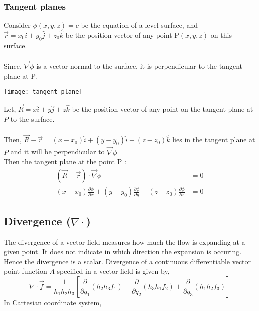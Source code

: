\subsubsection{Tangent planes}
\vspace{-0.8cm}
\begin{minipage}{0.6\textwidth}
	Consider $\phi(x, y, z)=c$ be the equation of a level surface, and $\vec{r}=x_{0} i+y_{0}\hat{j}+z_{0} \hat{k}$ be the position vector of
any point $\mathrm{P}(x, y, z)$ on this surface. \\\\Since, $ \vec{\nabla} \phi$ is a vector normal to the surface, it is perpendicular to the tangent plane at
P. 
\end{minipage}
\begin{minipage}{0.4\textwidth}
	\texttt{[image: tangent plane]}
\end{minipage}


 Let, $\vec{R}=x\hat{i}+y \hat{j}+z\hat{k}$ be the position vector of any point on the tangent plane at $P$ to the surface.\\\\  Then,
$\vec{R}-\vec{r}=(x-x_{0}) \hat{i}+(y-y_{0}) \hat{i}+(z-z_{0}) \hat{k}$ lies in the tangent plane at $P$ and it will be perpendicular to $\vec{\nabla} \phi$
\\Then the tangent plane at the point P :\begin{align*}
(\vec{R}-\vec{r}) \cdot \vec{\nabla} \phi&=0\\
(x-x_{0}) \frac{\partial \phi}{\partial x}+(y-y_{0}) \frac{\partial \phi}{\partial y}+(z-z_{0}) \frac{\partial \phi}{\partial z}&=0
\end{align*}

 


\subsection{Divergence ($\nabla \cdot$)}
The divergence of a vector field measures how much the flow is expanding at a given point. It does not indicate in which direction the expansion is occuring. Hence the divergence is a scalar. Divergence of a continuous differentiable vector point function $A$ specified in a vector field is given
by,
$$
{\nabla} \cdot \vec{f}=\frac{1}{h_{1} h_{2} h_{3}}\left[\frac{\partial}{\partial q_{1}}\left(h_{2} h_{3} f_{1}\right)+\frac{\partial}{\partial q_{2}}\left(h_{3} h_{1} f_{2}\right)+\frac{\partial}{\partial q_{3}}\left(h_{1} h_{2} f_{3}\right)\right]
$$
In Cartesian coordinate system,

